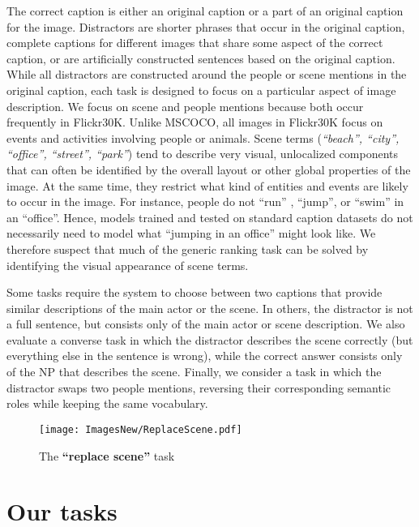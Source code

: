 \documentclass[11pt]{article}
\begin{document}
The correct caption is either an original caption or a part of an original caption for the image. Distractors are shorter phrases that occur in the original caption, complete captions for different images that share some aspect of the correct caption, or are artificially constructed sentences based on the original caption. 
While all distractors are constructed around the people or scene mentions in the original caption, each task is designed to focus on a particular aspect of image description.  We focus on scene and people mentions because both occur frequently in Flickr30K. Unlike MSCOCO, all images in Flickr30K focus on events and activities involving people or animals.  Scene terms (\textit{``beach'', ``city'', ``office'', ``street'', ``park''}) tend to describe very visual, unlocalized components that can often be identified by the overall layout or other global properties of the image. At the same time, they restrict what kind of entities and events are likely to occur in the image. For instance, people do not ``run'' , ``jump'', or ``swim'' in an ``office''. Hence, models trained and tested on standard caption datasets do not necessarily need to model what ``jumping in an office'' might look like. We therefore  suspect that much of the generic ranking task can be solved by identifying the visual appearance of scene terms. 

Some tasks require the system to choose between two captions that provide similar descriptions of the main actor or the scene. In others, the distractor is not a full sentence, but consists only of the main actor or scene description. We also evaluate a converse task in which the distractor describes the scene correctly (but everything else in the sentence is wrong), while the correct answer consists only of the NP that describes the scene. Finally, we consider a task in which the distractor swaps two people mentions, reversing their corresponding semantic roles while keeping the same vocabulary. 






\begin{figure}[tb] 
\centering \texttt{[image: ImagesNew/ReplaceScene.pdf]} \vspace{-.5in}
\caption{The \textbf{``replace scene''} task}
\label{fig:ReplaceScene} 
\end{figure}

\section{Our tasks}
\label{sec:task}
\end{document}

